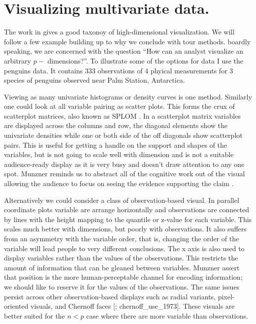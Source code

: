 \documentclass{template/monashthesis}
\begin{document}
\hypertarget{visualizing-multivariate-data.}{%
\section{Visualizing multivariate data.}\label{visualizing-multivariate-data.}}

The work in \textcite{grinstein_high-dimensional_2002} gives a good taxonoy of high-dimensional visualization. We will follow a few example building up to why we conclude with tour methods. boardly speaking, we are concerned with the question ``How can an analyst visualize an arbitrary \(p-\) dimensions?''. To illustrate some of the options for data I use the penguins data\autocite[horst\_palmerpenguins\_2020]{gorman_ecological_2014}. It contains 333 observations of 4 phyical measurements for 3 species of penguins observed near Palm Station, Antarctica.

Viewing as many univariate histograms or density curves is one method. Similarly one could look at all variable pairing as scatter plots. This forms the crux of scatterplot matrices, also known as SPLOM \autocite{chambers_graphical_1983}. In a scatterplot matrix variables are displayed across the columns and row, the diagonal elements show the univariate densities while one or both side of the off diagonals show scatterplot pairs. This is useful for getting a handle on the support and shapes of the variables, but is not going to scale well with dimension and is not a suitable audience-ready display as it is very busy and doesn't draw attention to any one spot. Munzner reminds us to abstract all of the cognitive work out of the visual allowing the audience to focus on seeing the evidence supporting the claim \autocite{munzner_visualization_2014}.



Alternatively we could consider a class of observation-based visual. In parallel coordinate plots \autocite{ocagne_coordonnees_1885} variable are arrange horizontally and observations are connected by lines with the height mapping to the quantile or z-value for each variable. This scales much better with dimensions, but poorly with observations. It also suffers from an asymmetry with the variable order, that is, changing the order of the variable will lead people to very different conclusions. The x axis is also used to display variables rather than the values of the observations. This restricts the amount of information that can be gleaned between variables. Munzner assert that position is the more human-perceptable channel for encoding information; we should like to reserve it for the values of the observations. The same issues persist across other observation-based displays such as radial variants, pixel-oriented visuals, and Chernoff faces {[}\textcite{keim_designing_2000}; chernoff\_use\_1973{]}. These visuals are better suited for the \(n<p\) case where there are more variable than observations.
\end{document}
